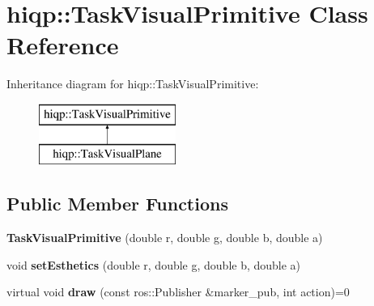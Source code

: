 \hypertarget{classhiqp_1_1TaskVisualPrimitive}{\section{hiqp\-:\-:Task\-Visual\-Primitive Class Reference}
\label{classhiqp_1_1TaskVisualPrimitive}
}
Inheritance diagram for hiqp\-:\-:Task\-Visual\-Primitive\-:\begin{figure}[H]
\begin{center}
\leavevmode
\includegraphics[height=2.000000cm]{classhiqp_1_1TaskVisualPrimitive}
\end{center}
\end{figure}
\subsection*{Public Member Functions}
\begin{DoxyCompactItemize}
\item 
\hypertarget{classhiqp_1_1TaskVisualPrimitive_afcac49ed0167f82760257b1193304f8c}{{\bfseries Task\-Visual\-Primitive} (double r, double g, double b, double a)}\label{classhiqp_1_1TaskVisualPrimitive_afcac49ed0167f82760257b1193304f8c}

\item 
\hypertarget{classhiqp_1_1TaskVisualPrimitive_add4cea0368114081cc191f072ae14971}{void {\bfseries set\-Esthetics} (double r, double g, double b, double a)}\label{classhiqp_1_1TaskVisualPrimitive_add4cea0368114081cc191f072ae14971}

\item 
\hypertarget{classhiqp_1_1TaskVisualPrimitive_a846fb1bd3c6ce220e9e53c35f6fac2de}{virtual void {\bfseries draw} (const ros\-::\-Publisher \&marker\-\_\-pub, int action)=0}\label{classhiqp_1_1TaskVisualPrimitive_a846fb1bd3c6ce220e9e53c35f6fac2de}

\end{DoxyCompactItemize}
